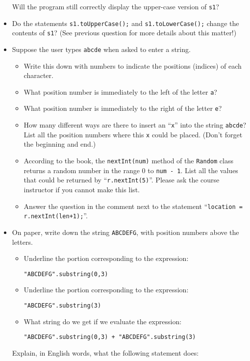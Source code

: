 \begin{itemize}
Will the program still correctly display the upper-case version of {\tt s1}?
\item
Do the statements {\tt s1.toUpperCase();} and {\tt s1.toLowerCase();}
change the contents of {\tt s1}? (See previous question for more details about this matter!)
\item
Suppose the user types {\tt abcde} when asked to enter a string.
\begin{itemize}
\item Write this down with numbers to indicate the positions (indices) of each character.
\item
What position number is immediately to the left of the letter {\tt a}?
\item
What position number is immediately to the right of the letter {\tt e}?
\item
How many different ways are there to insert an ``{\tt x}'' into the string
{\tt abcde}? List all the position numbers where this {\tt x} could be placed.
(Don't forget the beginning and end.)
\item
According to the book, the {\tt nextInt(num)} method of the {\tt Random}
class returns a random number in the range 0 to {\tt num - 1}.
List all the values that could be returned by ``{\tt r.nextInt(5)}''. Please ask the course instructor if you cannot
make this list.
\item
Answer the question in the comment next to the statement ``\verb$location = r.nextInt(len+1);$''.
\end{itemize}
\item
On paper, write down the string {\tt ABCDEFG}, with position numbers
above the letters.
\begin{itemize}
\item
Underline the portion corresponding to the
expression:
\begin{center}
\verb$"ABCDEFG".substring(0,3)$
\end{center}
\item
Underline the portion corresponding to the
expression:
\begin{center}
\verb$"ABCDEFG".substring(3)$
\end{center}
\item
What string do we get if we evaluate the expression:
\begin{center}
\verb$"ABCDEFG".substring(0,3) + "ABCDEFG".substring(3)$
\end{center}
\end{itemize}
Explain, in English words, what the following statement does:

\end{itemize}
